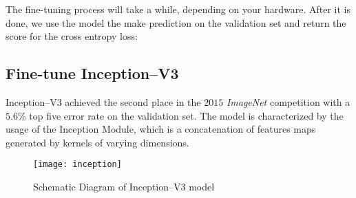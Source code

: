 
The fine-tuning process will take a while, depending on your hardware. 
After it is done, we use the model the make prediction on the validation set 
and return the score for the cross entropy loss:



\subsection{Fine-tune Inception--V3}
\label{subsec:inception}
Inception--V3 achieved the second place in the $2015$ \emph{ImageNet} 
competition with a $5.6 \%$ top five error rate on the validation set. 
The model is characterized by the usage of the Inception Module, which is a 
concatenation of features maps generated by kernels of varying dimensions.
%
\begin{figure}[htb]
\centering
\texttt{[image: inception]}
\caption{Schematic Diagram of Inception--V3 model}
\label{fig:inceptionV3schema}
\end{figure}
%
